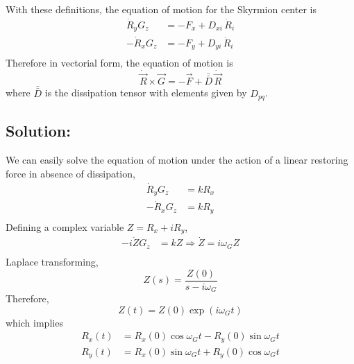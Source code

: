 \documentclass[aps,prb,onecolumn,notitlepage,showpacs,floatfix,superscriptaddress]{revtex4-1}
\begin{document}
With these definitions, the equation of motion for the Skyrmion center is
\begin{equation}
\begin{split}
\dot{R}_y G_z &= -F_x + D_{xi}\, \dot{R}_i  \\
-\dot{R}_x G_z &= -F_y + D_{yi}\, \dot{R}_i  \\
\end{split}
\end{equation}
Therefore in vectorial form, the equation of motion is
\begin{equation}
\dot{\vec{R}} \times \vec{G} = -\vec{F} + \bar{\bar{D}} \, \dot{\vec{R}}
\end{equation}
where $\bar{\bar{D}}$ is the dissipation tensor with elements given by $D_{pq}$.
\subsection{Solution:}
We can easily solve the equation of motion under the action of a linear restoring force in absence of dissipation,
\begin{equation}
\begin{split}
\dot{R}_y G_z &= k R_x  \\
-\dot{R}_x G_z &= k R_y   \\
\end{split}
\end{equation}
Defining a complex variable $Z = R_x +i R_y$,
\begin{equation}
\begin{split}
-i\dot{Z} G_z &= k Z   \Rightarrow \dot{Z} = i \omega_G Z\\
\end{split}
\end{equation}
Laplace transforming,
\begin{equation}
Z(s) = \dfrac{Z(0)}{s-i\omega_G}
\end{equation}
Therefore,
\begin{equation}
Z(t) = Z(0) \exp\left( i\omega_G t\right)
\end{equation}
which implies
\begin{equation}
\begin{split}
R_x(t) &= R_x(0) \cos\omega_G t - R_y(0) \sin\omega_G t \\
R_y(t) &= R_x(0) \sin\omega_G t + R_y(0) \cos\omega_G t 
\end{split}
\end{equation}
\end{document}

